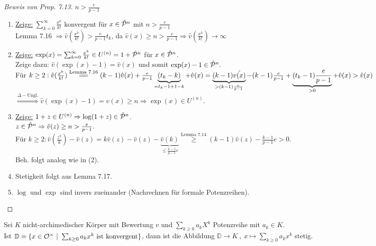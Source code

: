 \begin{proof}[Beweis von Prop. 7.13]
$n>\frac{e}{p-1}$\\
\begin{enumerate}[(1)]
\item \underline{Zeige:} $\sum_{k=0}^\infty \frac{x^k}{k!}$ konvergent für $x \in \hat{\mathcal{P}}^n$ mit $n>\frac{e}{p-1}$\\
Lemma 7.16 $\Rightarrow \hat{v}(\frac{x^k}{k!})>\frac{e}{p-1}t_k$, da $\hat{v}(x) \geq n > \frac{e}{p-1} \Rightarrow \hat{v}(\frac{x^k}{k!}) \to \infty$
\item \underline{Zeige:} $\exp(x)=\sum_{k=0}^\infty \frac{x^k}{k!} \in U^{(n)} = 1+\hat{\mathcal{P}}^n$ für $x \in \hat{\mathcal{P}}^n$.\\
Zeige dazu: $\hat{v}(\exp(x)-1)=\hat{v}(x)$ und somit $\exp(x)-1 \in \hat{\mathcal{P}}^n.$\\
Für $k\geq 2: \hat{v}(\frac{x^k}{k!}) \stackrel{\text{Lemma 7.16}}{=\joinrel =} (k-1) \hat{v}(x)+\frac{e}{p-1}\underbrace{(t_k-k)}_{=t_k-1+1-k}+\hat{v}(x)\\
=\underbrace{(k-1)\hat{v(x)}}_{>(k-1)\frac{e}{p-1}}-(k-1)\frac{e}{p-1}+ \underbrace{(t_k-1)\frac{e}{p-1}}_{>0} + \hat{v}(x)>\hat{v}(x)$\\
$\stackrel{\Delta-\text{Ungl.}}{\Rightarrow} \hat{v}(\exp(x)-1)=\hat{v}(x) \geq n \Rightarrow \exp(x) \in U^{(n)}.$
\item \underline{Zeige:} $1+z\in U^{(n)} \Rightarrow \log(1+z)\in \hat{\mathcal{P}}^n$.\\
$z\in \hat{\mathcal{P}}^n \Rightarrow \hat{v}(z) \geq n > \frac{e}{p-1}.$\\
Für $k \geq 2: \hat{v}(\frac{z^k}{k})-\hat{v}(z) = k \hat{v}(z) - \hat{v}(z) - \underbrace{\hat{v}(k)}_{\leq \frac{k-1}{p-1}e} \stackrel{\text{Lemma 7.14}}{\geq} (k-1)\hat{v}(z) - \frac{k-1}{p-1}e >0$.\\
Beh. folgt analog wie in (2).
\item Stetigkeit folgt aus Lemma 7.17.
\item $\log$ und $\exp$ sind invers zueinander (Nachrechnen für formale Potenzreihen).
\end{enumerate}
\end{proof}

\begin{Lem}
Sei $K$ nicht-archimedischer Körper mit Bewertung $v$ und $\sum_{k \geq 0} a_k X^k$ Potenzreihe mit $a_k \in K$.\\
Ist $\mathbb{D}=\{x \in \O^\times \ | \ \sum_{k \geq 0} a_k x^k \text{ ist konvergent} \}$, dann ist die Abbildung $\mathbb{D} \to K \ , \ x \mapsto \sum_{k\geq 0} a_k x^k$ stetig.
\end{Lem}

